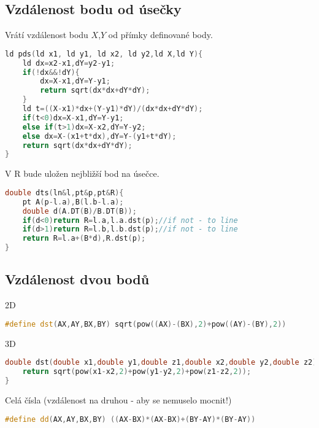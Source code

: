 \documentclass[11pt]{article}
\begin{document}
\subsection{Vzdálenost bodu od úsečky}
Vrátí vzdálenost bodu $X$,$Y$ od přímky definované body.
\begin{lstlisting}[language=C++]
ld pds(ld x1, ld y1, ld x2, ld y2,ld X,ld Y){
    ld dx=x2-x1,dY=y2-y1;
    if(!dx&&!dY){
        dx=X-x1,dY=Y-y1;
        return sqrt(dx*dx+dY*dY);
    }
    ld t=((X-x1)*dx+(Y-y1)*dY)/(dx*dx+dY*dY);
    if(t<0)dx=X-x1,dY=Y-y1;
    else if(t>1)dx=X-x2,dY=Y-y2;
    else dx=X-(x1+t*dx),dY=Y-(y1+t*dY);
    return sqrt(dx*dx+dY*dY);
}
\end{lstlisting}
V \textsf{R} bude uložen nejbližší bod na úsečce.
\begin{lstlisting}[language=C++]
double dts(ln&l,pt&p,pt&R){
    pt A(p-l.a),B(l.b-l.a);
    double d(A.DT(B)/B.DT(B));
    if(d<0)return R=l.a,l.a.dst(p);//if not - to line
    if(d>1)return R=l.b,l.b.dst(p);//if not - to line
    return R=l.a+(B*d),R.dst(p);
}
\end{lstlisting}
\subsection{Vzdálenost dvou bodů}
\begin{center}
2D
\end{center}
\begin{lstlisting}[language=C++]
#define dst(AX,AY,BX,BY) sqrt(pow((AX)-(BX),2)+pow((AY)-(BY),2))
\end{lstlisting}
\begin{center}
3D
\end{center}
\begin{lstlisting}[language=C++]
double dst(double x1,double y1,double z1,double x2,double y2,double z2){
    return sqrt(pow(x1-x2,2)+pow(y1-y2,2)+pow(z1-z2,2));
}
\end{lstlisting}
\begin{center}
Celá čísla (vzdálenost na druhou - aby se nemuselo mocnit!)
\end{center}
\begin{lstlisting}[language=C++]
#define dd(AX,AY,BX,BY) ((AX-BX)*(AX-BX)+(BY-AY)*(BY-AY))
\end{lstlisting}
\end{document}
